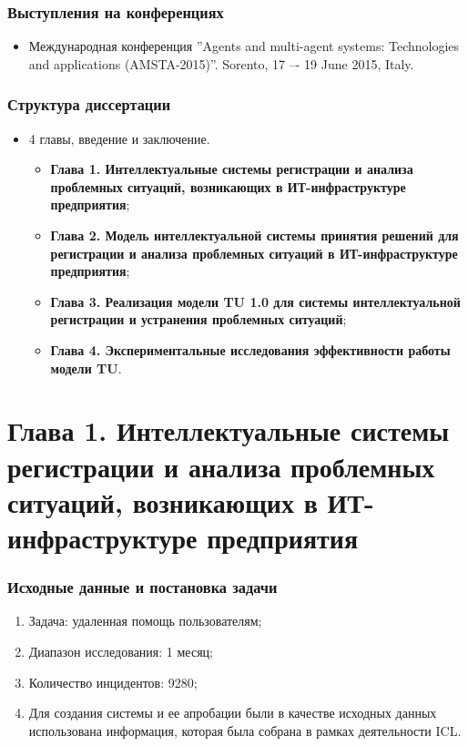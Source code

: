 \documentclass[14pt]{beamer}
\begin{document}
\begin{frame}
\frametitle{Выступления на конференциях}

\begin{itemize}
	\item Международная конференция ”Agents and multi-agent systems: Technologies and applications (AMSTA-2015)”. Sorento, 17 –- 19 June 2015, Italy.
	
\end{itemize}
\end{frame}

\begin{frame}
\frametitle{Структура диссертации}
\begin{itemize}
\item 4 главы, введение и заключение.
\begin{itemize}
  \item \textbf{Глава 1. Интеллектуальные системы регистрации и анализа проблемных ситуаций, возникающих в ИТ-инфраструктуре предприятия};
  \item  \textbf{Глава 2. Модель интеллектуальной системы принятия решений для регистрации и анализа проблемных ситуаций в ИТ-инфраструктуре предприятия};
  \item \textbf{Глава 3. Реализация модели TU 1.0 для системы интеллектуальной регистрации и устранения проблемных ситуаций};
  \item \textbf{Глава 4. Экспериментальные исследования эффективности работы модели TU}.
 \end{itemize}
\end{itemize}
\end{frame}







%
%
\section[Глава 1]{Глава 1. Интеллектуальные системы регистрации и анализа проблемных ситуаций, возникающих в ИТ-инфраструктуре предприятия}
\begin{frame}
\frametitle{Исходные данные и постановка задачи}
\begin{enumerate}
  \item Задача: удаленная помощь пользователям;
  \item Диапазон исследования: 1 месяц;
  \item Количество инцидентов: 9280;
  \item Для создания системы и ее апробации были в качестве исходных данных использована информация, которая была собрана в рамках деятельности ICL.


\end{enumerate}
\end{frame}
\end{document}
